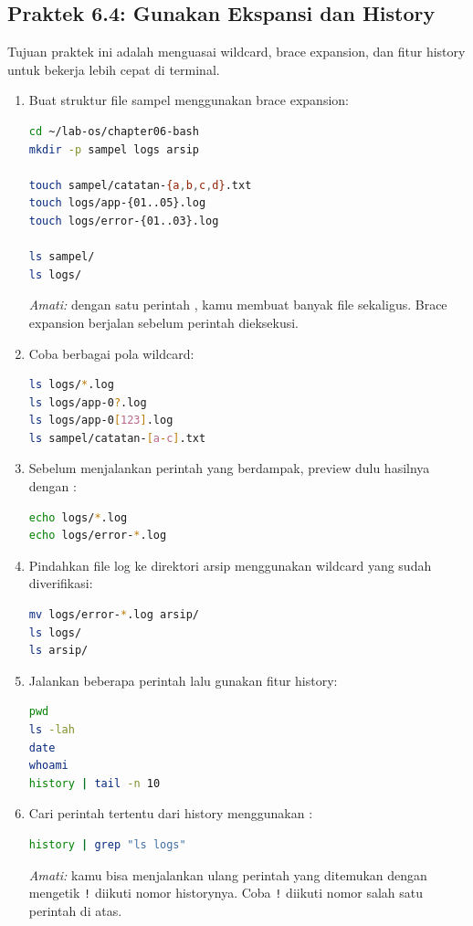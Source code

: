 \subsection*{Praktek 6.4: Gunakan Ekspansi dan History}

Tujuan praktek ini adalah menguasai wildcard, brace expansion, dan
fitur history untuk bekerja lebih cepat di terminal.

\begin{enumerate}
    \item Buat struktur file sampel menggunakan brace expansion:
\begin{lstlisting}[language=bash, caption={Membuat file sampel dengan brace expansion}]
cd ~/lab-os/chapter06-bash
mkdir -p sampel logs arsip

touch sampel/catatan-{a,b,c,d}.txt
touch logs/app-{01..05}.log
touch logs/error-{01..03}.log

ls sampel/
ls logs/
\end{lstlisting}
    \textit{Amati:} dengan satu perintah , kamu membuat banyak
    file sekaligus. Brace expansion berjalan sebelum perintah dieksekusi.

    \item Coba berbagai pola wildcard:
\begin{lstlisting}[language=bash, caption={Menggunakan wildcard untuk memfilter file}]
ls logs/*.log
ls logs/app-0?.log
ls logs/app-0[123].log
ls sampel/catatan-[a-c].txt
\end{lstlisting}

    \item Sebelum menjalankan perintah yang berdampak, preview dulu hasilnya
          dengan :
\begin{lstlisting}[language=bash, caption={Preview wildcard sebelum operasi nyata}]
echo logs/*.log
echo logs/error-*.log
\end{lstlisting}

    \item Pindahkan file log ke direktori arsip menggunakan wildcard yang
          sudah diverifikasi:
\begin{lstlisting}[language=bash, caption={Memindahkan file log ke arsip}]
mv logs/error-*.log arsip/
ls logs/
ls arsip/
\end{lstlisting}

    \item Jalankan beberapa perintah lalu gunakan fitur history:
\begin{lstlisting}[language=bash, caption={Menggunakan history Bash}]
pwd
ls -lah
date
whoami
history | tail -n 10
\end{lstlisting}

    \item Cari perintah tertentu dari history menggunakan :
\begin{lstlisting}[language=bash, caption={Mencari perintah di history}]
history | grep "ls logs"
\end{lstlisting}
    \textit{Amati:} kamu bisa menjalankan ulang perintah yang ditemukan
    dengan mengetik \texttt{!} diikuti nomor historynya. Coba \texttt{!}
    diikuti nomor salah satu perintah di atas.
\end{enumerate}

